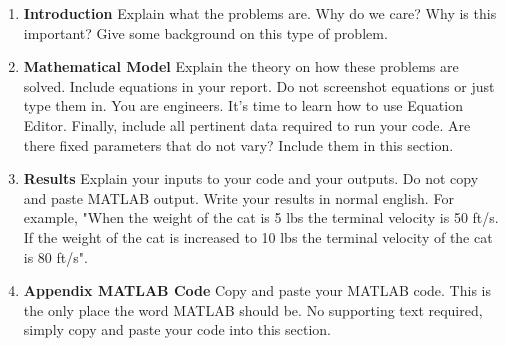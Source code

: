 \begin{enumerate}
\item{{\bf Introduction}} 
Explain what the problems are. Why do we care? Why
is this important? Give some background on this type of problem. 
\item{{\bf Mathematical Model}}
Explain the theory on how these problems are
solved. Include equations in your report. Do not screenshot equations
or just type them in. You are engineers. It's time to learn how to use
Equation Editor. Finally, include all pertinent data required to run
your code. Are there fixed parameters that do not vary? Include them
in this section. 
\item{{\bf Results}}
Explain your inputs to your code and your outputs. Do
not copy and paste MATLAB output. Write your results in normal
english. For example, "When the weight of the cat is 5 lbs the
terminal velocity is 50 ft/s. If the weight of the cat is increased to
10 lbs the terminal velocity of the cat is 80 ft/s".  
\item{{\bf Appendix MATLAB Code}}
Copy and paste your MATLAB code. This is
the only place the word MATLAB should be. No supporting text required,
simply copy and paste your code into this section. 
\end{enumerate}
